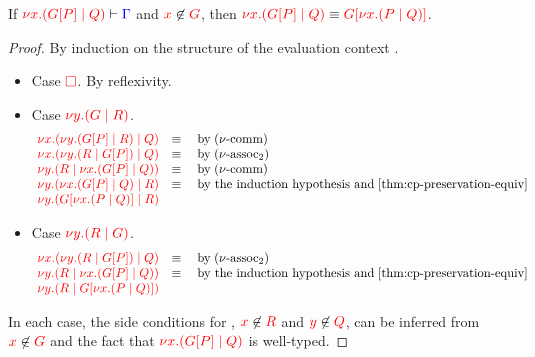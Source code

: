 \begin{lemmaB}\label{thm:cp-display-1}
  If $\seq[{ \tm{\cpCut{x}{\cpPlug{G}{P}}{Q}} }]{ \Gamma }$ and
  $\notFreeIn{x}{G}$, then $\tm{\cpCut{x}{\cpPlug{G}{P}}{Q}} \equiv
  \tm{\cpPlug{G}{\cpCut{x}{P}{Q}}}$. 
\end{lemmaB}
\begin{proof}
  By induction on the structure of the evaluation context .
  \begin{itemize}
  \item
    Case $\tm{\Box}$. By reflexivity.
  \item
    Case $\tm{\cpCut{y}{G}{R}}$.
    \[\!
      \begin{array}{ll}
        \tm{\cpCut{x}{\cpCut{y}{\cpPlug{G}{P}}{R}}{Q}} & \equiv \quad \text{by} \; \cpEquivCutComm\\
        \tm{\cpCut{x}{\cpCut{y}{R}{\cpPlug{G}{P}}}{Q}} & \equiv \quad \text{by} \; \cpEquivCutAss2 \\
        \tm{\cpCut{y}{R}{\cpCut{x}{\cpPlug{G}{P}}{Q}}} & \equiv \quad \text{by} \; \cpEquivCutComm \\
        \tm{\cpCut{y}{\cpCut{x}{\cpPlug{G}{P}}{Q}}{R}} & \equiv \quad \text{by the induction hypothesis and} \; \cref{thm:cp-preservation-equiv}\\
        \tm{\cpCut{y}{\cpPlug{G}{\cpCut{x}{P}{Q}}}{R}} &
      \end{array}
    \]
  \item
    Case $\tm{\cpCut{y}{R}{G}}$.
    \[\!
      \begin{array}{ll}
        \tm{\cpCut{x}{\cpCut{y}{R}{\cpPlug{G}{P}}}{Q}} & \equiv \quad \text{by} \; \cpEquivCutAss2\\
        \tm{\cpCut{y}{R}{\cpCut{x}{\cpPlug{G}{P}}{Q}}} & \equiv \quad \text{by the induction hypothesis and} \; \cref{thm:cp-preservation-equiv}\\
        \tm{\cpCut{y}{R}{\cpPlug{G}{\cpCut{x}{P}{Q}}}}
      \end{array}
    \]
  \end{itemize}
  In each case, the side conditions for , $\notFreeIn{x}{R}$ and
  $\notFreeIn{y}{Q}$, can be inferred from $\notFreeIn{x}{G}$ and the fact that
  $\tm{\cpCut{x}{\cpPlug{G}{P}}{Q}}$ is well-typed.
\end{proof}
